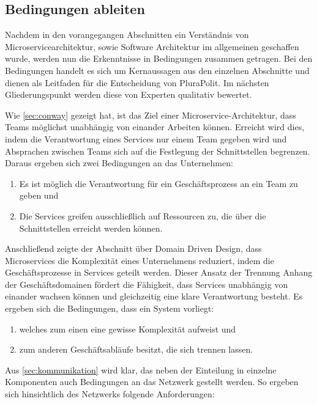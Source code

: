 \subsection{Bedingungen ableiten}
\label{sec:bedingungen}

Nachdem in den vorangegangen Abschnitten ein Verständnis von Microservicearchitektur, sowie Software Architektur im allgemeinen geschaffen wurde, werden nun die Erkenntnisse in Bedingungen zusammen getragen. Bei den Bedingungen handelt es sich um Kernaussagen aus den einzelnen Abschnitte und dienen als Leitfaden für die Entscheidung von PluraPolit. Im nächsten Gliederungspunkt werden diese von Experten qualitativ bewertet.

Wie \cref{sec:conway} gezeigt hat, ist das Ziel einer Microservice-Architektur,  dass Teams möglichst unabhängig von einander Arbeiten können. Erreicht wird dies, indem die Verantwortung eines Services nur einem Team gegeben wird und Absprachen zwischen Teams sich auf die Festlegung der Schnittstellen begrenzen. Daraus ergeben sich zwei Bedingungen an das Unternehmen:

\begin{enumerate}
	\item Es ist möglich die Verantwortung für ein Geschäftsprozess an ein Team zu geben und
	\item Die Services greifen ausschließlich auf Ressourcen zu, die über die Schnittstellen erreicht werden können.
\end{enumerate}

Anschließend zeigte der Abschnitt über Domain Driven Design, dass Microservices die Komplexität eines Unternehmens reduziert, indem die Geschäftsprozesse in Services geteilt werden. Dieser Ansatz der Trennung Anhang der Geschäftsdomainen fördert die Fähigkeit, dass Services unabhängig von einander wachsen können und gleichzeitig eine klare Verantwortung besteht. Es ergeben sich die Bedingungen, dass ein System vorliegt:

\begin{enumerate}
	\item welches zum einen eine gewisse Komplexität aufweist und
	\item zum anderen Geschäftsabläufe besitzt, die sich trennen lassen.
\end{enumerate}

Aus \cref{sec:kommunikation} wird klar, das neben der Einteilung in einzelne Komponenten auch Bedingungen an das Netzwerk gestellt werden. So ergeben sich hinsichtlich des Netzwerks folgende Anforderungen:

